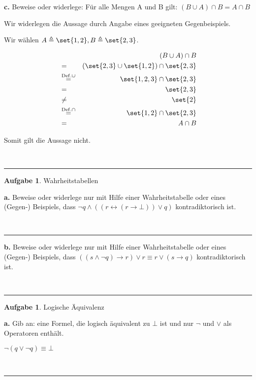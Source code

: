\documentclass[10pt,leqno ]{article}
\DeclarePairedDelimiter\set\{\}
\newcommand\customeq[1]{\overset{\mathrm{#1}}{=}}
\theoremstyle{definition}
\newtheorem{problem}[theorem]{Aufgabe}
\newenvironment{solution}[1][L]{\begin{doublespace}\textbf{#1.}\quad }{\ \rule{0.5em}{0.5em}\end{doublespace}}
\begin{document}
\begin{solution}[c]
Beweise oder widerlege: Für alle Mengen A und B gilt: \( (B \cup A) \cap B = A \cap B \)

Wir widerlegen die Aussage durch Angabe eines geeigneten Gegenbeispiels.

Wir wählen \( A \triangleq \set{1,2}, B \triangleq \set{2,3} \).

\begin{align*}
    & & (B \cup A) \cap B  \\
    &= & (\set{2,3} \cup \set{1,2}) \cap \set{2,3}  \\
    & \customeq{Def. \cup} & \set{1,2,3} \cap \set{2,3}  \\
    &= & \set{2,3} \\
    & \neq & \set{2}  \\
    & \customeq{Def. \cap} & \set{1,2} \cap \set{2,3}  \\
    &= & A \cap B \\
\end{align*}

Somit gilt die Aussage nicht.

\end{solution}

\begin{problem}
    Wahrheitstabellen
\end{problem}

\begin{solution}[a]
Beweise oder widerlege nur mit Hilfe einer Wahrheitstabelle oder eines (Gegen-) Beispiels, dass \( \lnot q \land ((r \leftrightarrow (r \rightarrow \bot)) \lor q ) \) kontradiktorisch ist.

\end{solution}

\begin{solution}[b]
Beweise oder widerlege nur mit Hilfe einer Wahrheitstabelle oder eines (Gegen-) Beispiels, dass \( ((s \land \lnot q) \rightarrow r) \lor r \equiv r \lor (s \rightarrow q) \) kontradiktorisch ist.

\end{solution}


\begin{problem}
    Logische Äquivalenz
\end{problem}

\begin{solution}[a]
Gib an: eine Formel, die logisch äquivalent zu \( \bot \) ist und nur  \( \lnot \) und \( \lor \) als Operatoren enthält. 

\( \lnot (q \lor \lnot q) \equiv \bot \)
    
\end{solution}
    
\end{document}
